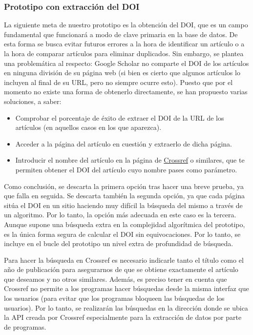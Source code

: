 \subsubsection{Prototipo con extracción del DOI}

La siguiente meta de nuestro prototipo es la obtención del DOI, que es un campo fundamental que funcionará a modo de clave primaria en la base de datos. De esta forma se busca evitar futuros errores a la hora de identificar un artículo o a la hora de comparar artículos para eliminar duplicados. Sin embargo, se plantea una problemática al respecto: Google Scholar no comparte el DOI de los artículos en ninguna división de su página web (si bien es cierto que algunos artículos lo incluyen al final de su URL, pero no siempre ocurre esto). Puesto que por el momento no existe una forma de obtenerlo directamente, se han propuesto varias soluciones, a saber:
\begin{itemize}
	\item Comprobar el porcentaje de éxito de extraer el DOI de la URL de los artículos (en aquellos casos en los que aparezca).
	\item Acceder a la página del artículo en cuestión y extraerlo de dicha página.
         \item Introducir el nombre del artículo en la página de \href{https://www.crossref.org/}{Crossref} o similares, que te permiten obtener el DOI del artículo cuyo nombre pases como parámetro.
\end{itemize}
Como conclusión, se descarta la primera opción tras hacer una breve prueba, ya que falla en seguida. Se descarta también la segunda opción, ya que cada página sitúa el DOI en un sitio haciendo muy difícil la búsqueda del mismo a través de un algoritmo. Por lo tanto, la opción más adecuada en este caso es la tercera. Aunque supone una búsqueda extra en la complejidad algorítmica del prototipo, es la única forma segura de calcular el DOI sin equivocaciones. Por lo tanto, se incluye en el bucle del prototipo un nivel extra de profundidad de búsqueda.

Para hacer la búsqueda en Crossref es necesario indicarle tanto el título como el año de publicación para asegurarnos de que se obtiene exactamente el artículo que deseamos y no otros similares. Además, es preciso tener en cuenta que Crossref no permite a los programas hacer búsquedas desde la misma interfaz que los usuarios (para evitar que los programas bloqueen las búsquedas de los usuarios). Por lo tanto, se realizarán las búsquedas en la dirección donde se ubica la API creada por Crossref especialmente para la extracción de datos por parte de programas.

